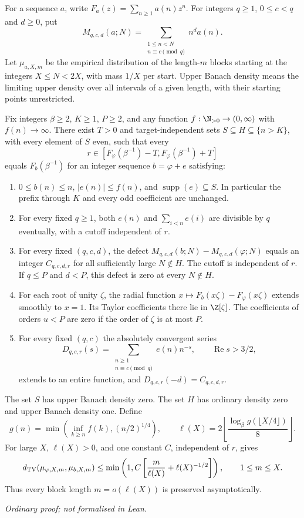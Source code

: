For a sequence $a$, write $F_a(z)=\sum_{n\ge1}a(n)z^n$. For integers
$q\ge1$, $0\le c<q$ and $d\ge0$, put
\[
 M_{q,c,d}(a;N)=\sum_{\substack{1\le n<N\\ n\equiv c\pmod q}}n^d a(n).
\]
Let $\mu_{a,X,m}$ be the empirical distribution of the length-$m$ blocks
starting at the integers $X\le N<2X$, with mass $1/X$ per start. Upper
Banach density means the limiting upper density over all intervals of a
given length, with their starting points unrestricted.

\begin{rem}
\label{long249:thm:signed-interpolation}
Fix integers $\beta\ge2$, $K\ge1$, $P\ge2$, and any function
$f:\N_{>0}\to(0,\infty)$ with $f(n)\to\infty$. There exist $T>0$ and
target-independent sets $S\subseteq H\subseteq\{n>K\}$, with every
element of $S$ even, such that every
\[
 r\in[F_\varphi(\beta^{-1})-T,F_\varphi(\beta^{-1})+T]
\]
equals $F_b(\beta^{-1})$ for an integer sequence $b=\varphi+e$ satisfying:
\begin{enumerate}[label=(\roman*)]
\item $0\le b(n)\le n$, $|e(n)|\le f(n)$, and
$\operatorname{supp}(e)\subseteq S$. In particular the prefix through $K$
and every odd coefficient are unchanged.
\item For every fixed $q\ge1$, both $e(n)$ and $\sum_{i<n}e(i)$ are
divisible by $q$ eventually, with a cutoff independent of $r$.
\item For every fixed $(q,c,d)$, the defect
$M_{q,c,d}(b;N)-M_{q,c,d}(\varphi;N)$ equals an integer $C_{q,c,d,r}$
for all sufficiently large $N\notin H$. The cutoff is independent of $r$.
If $q\le P$ and $d<P$, this defect is zero at every $N\notin H$.
\item For each root of unity $\zeta$, the radial function
$x\mapsto F_b(x\zeta)-F_\varphi(x\zeta)$ extends smoothly to $x=1$.
Its Taylor coefficients there lie in $\Z[\zeta]$. The coefficients of
orders $u<P$ are zero if the order of $\zeta$ is at most $P$.
\item For every fixed $(q,c)$ the absolutely convergent series
\[
 D_{q,c,r}(s)=\sum_{\substack{n\ge1\\n\equiv c\pmod q}}e(n)n^{-s},
 \qquad \operatorname{Re}s>3/2,
\]
extends to an entire function, and $D_{q,c,r}(-d)=C_{q,c,d,r}$.
\end{enumerate}
The set $S$ has upper Banach density zero. The set $H$ has ordinary density
zero and upper Banach density one. Define
\[
 g(n)=\min\left(\inf_{k\ge n}f(k),(n/2)^{1/4}\right),\qquad
 \ell(X)=2\left\lfloor\frac{\log_\beta g(\lfloor X/4\rfloor)}8\right\rfloor.
\]
For large $X$, $\ell(X)>0$, and one constant $C$, independent of $r$, gives
\[
 d_{\rm TV}(\mu_{\varphi,X,m},\mu_{b,X,m})
 \le\min\left(1,C\left[\frac m{\ell(X)}+\ell(X)^{-1/2}\right]\right),
 \qquad 1\le m\le X.
\]
Thus every block length $m=o(\ell(X))$ is preserved asymptotically.
\end{rem}
\noindent\emph{Ordinary proof; not formalised in Lean.}


